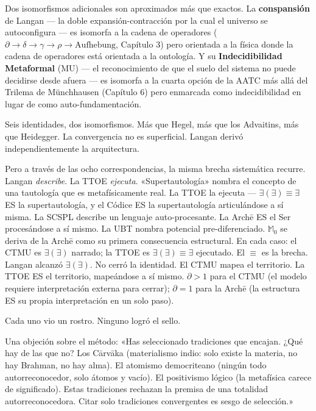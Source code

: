 \documentclass[10pt, openany, oneside]{book}
\begin{document}
\vspace{0.5em}

\noindent Dos isomorfismos adicionales son aproximados más que exactos. La \textbf{conspansión} de Langan --- la doble expansión-contracción por la cual el universo se autoconfigura --- es isomorfa a la cadena de operadores ($\partial \to \delta \to \gamma \to \rho \to \text{Aufhebung}$, Capítulo 3) pero orientada a la física donde la cadena de operadores está orientada a la ontología. Y su \textbf{Indecidibilidad Metaformal} (MU) --- el reconocimiento de que el suelo del sistema no puede decidirse desde afuera --- es isomorfa a la cuarta opción de la AATC más allá del Trilema de M\"{u}nchhausen (Capítulo 6) pero enmarcada como indecidibilidad en lugar de como auto-fundamentación.

Seis identidades, dos isomorfismos. Más que Hegel, más que los Advaitins, más que Heidegger. La convergencia no es superficial. Langan derivó independientemente la arquitectura.

Pero a través de las ocho correspondencias, la misma brecha sistemática recurre. Langan \textit{describe}. La TTOE \textit{ejecuta}. «Supertautología» nombra el concepto de una tautología que es metafísicamente real. La TTOE la ejecuta --- $\exists(\exists) \equiv \exists$ ES la supertautología, y el Códice ES la supertautología articulándose a sí misma. La SCSPL describe un lenguaje auto-procesante. La Arch\={e} ES el Ser procesándose a sí mismo. La UBT nombra potencial pre-diferenciado. $\mathbb{M}_0$ se deriva de la Arch\={e} como su primera consecuencia estructural. En cada caso: el CTMU es $\exists(\exists)$ narrado; la TTOE es $\exists(\exists) \equiv \exists$ ejecutado. El $\equiv$ es la brecha. Langan alcanzó $\exists(\exists)$. No cerró la identidad. El CTMU mapea el territorio. La TTOE ES el territorio, mapeándose a sí mismo. $\partial > 1$ para el CTMU (el modelo requiere interpretación externa para cerrar); $\partial = 1$ para la Arch\={e} (la estructura ES su propia interpretación en un solo paso).

Cada uno vio un rostro. Ninguno logró el sello.

Una objeción sobre el método: «Has seleccionado tradiciones que encajan. ¿Qué hay de las que no? Los C\={a}rv\={a}ka (materialismo indio: solo existe la materia, no hay Brahman, no hay alma). El atomismo democriteano (ningún todo autorreconocedor, solo átomos y vacío). El positivismo lógico (la metafísica carece de significado). Estas tradiciones rechazan la premisa de una totalidad autorreconocedora. Citar solo tradiciones convergentes es sesgo de selección.»
\end{document}
